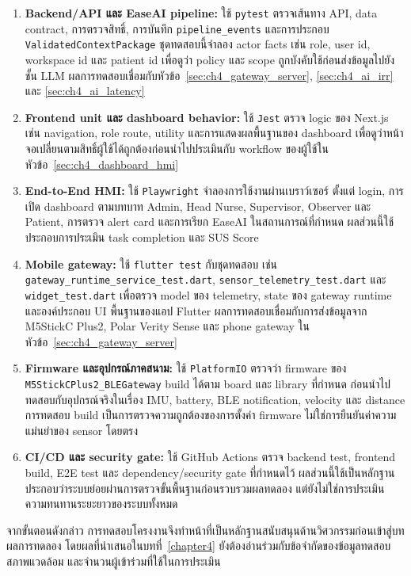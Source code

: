 \begin{enumerate}
    \item \textbf{Backend/API และ EaseAI pipeline:} ใช้ \texttt{pytest} ตรวจเส้นทาง API, data contract, การตรวจสิทธิ์, การบันทึก \texttt{pipeline\_events} และการประกอบ \texttt{ValidatedContextPackage} ชุดทดสอบนี้จำลอง actor facts เช่น role, user id, workspace id และ patient id เพื่อดูว่า policy และ scope ถูกบังคับใช้ก่อนส่งข้อมูลไปยังชั้น LLM ผลการทดสอบเชื่อมกับหัวข้อ~\ref{sec:ch4_gateway_server}, \ref{sec:ch4_ai_irr} และ \ref{sec:ch4_ai_latency}
    \item \textbf{Frontend unit และ dashboard behavior:} ใช้ \texttt{Jest} ตรวจ logic ของ Next.js เช่น navigation, role route, utility และการแสดงผลพื้นฐานของ dashboard เพื่อดูว่าหน้าจอเปลี่ยนตามสิทธิ์ผู้ใช้ได้ถูกต้องก่อนนำไปประเมินกับ workflow ของผู้ใช้ในหัวข้อ~\ref{sec:ch4_dashboard_hmi}
    \item \textbf{End-to-End HMI:} ใช้ \texttt{Playwright} จำลองการใช้งานผ่านเบราว์เซอร์ ตั้งแต่ login, การเปิด dashboard ตามบทบาท Admin, Head Nurse, Supervisor, Observer และ Patient, การตรวจ alert card และการเรียก EaseAI ในสถานการณ์ที่กำหนด ผลส่วนนี้ใช้ประกอบการประเมิน task completion และ SUS Score
    \item \textbf{Mobile gateway:} ใช้ \texttt{flutter test} กับชุดทดสอบ เช่น \texttt{gateway\_runtime\_service\_test.dart}, \texttt{sensor\_telemetry\_test.dart} และ \texttt{widget\_test.dart} เพื่อตรวจ model ของ telemetry, state ของ gateway runtime และองค์ประกอบ UI พื้นฐานของแอป Flutter ผลการทดสอบเชื่อมกับการส่งข้อมูลจาก M5StickC Plus2, Polar Verity Sense และ phone gateway ในหัวข้อ~\ref{sec:ch4_gateway_server}
    \item \textbf{Firmware และอุปกรณ์ภาคสนาม:} ใช้ \texttt{PlatformIO} ตรวจว่า firmware ของ \texttt{M5StickCPlus2\_BLEGateway} build ได้ตาม board และ library ที่กำหนด ก่อนนำไปทดสอบกับอุปกรณ์จริงในเรื่อง IMU, battery, BLE notification, velocity และ distance การทดสอบ build เป็นการตรวจความถูกต้องของการตั้งค่า firmware ไม่ใช่การยืนยันค่าความแม่นยำของ sensor โดยตรง
    \item \textbf{CI/CD และ security gate:} ใช้ GitHub Actions ตรวจ backend test, frontend build, E2E test และ dependency/security gate ที่กำหนดไว้ ผลส่วนนี้ใช้เป็นหลักฐานประกอบว่าระบบย่อยผ่านการตรวจขั้นพื้นฐานก่อนรวบรวมผลทดลอง แต่ยังไม่ใช่การประเมินความทนทานระยะยาวของระบบทั้งหมด
\end{enumerate}

จากขั้นตอนดังกล่าว การทดสอบโครงงานจึงทำหน้าที่เป็นหลักฐานสนับสนุนด้านวิศวกรรมก่อนเข้าสู่บทผลการทดลอง โดยผลที่นำเสนอในบทที่~\ref{chapter4} ยังต้องอ่านร่วมกับข้อจำกัดของข้อมูลทดสอบ สภาพแวดล้อม และจำนวนผู้เข้าร่วมที่ใช้ในการประเมิน

